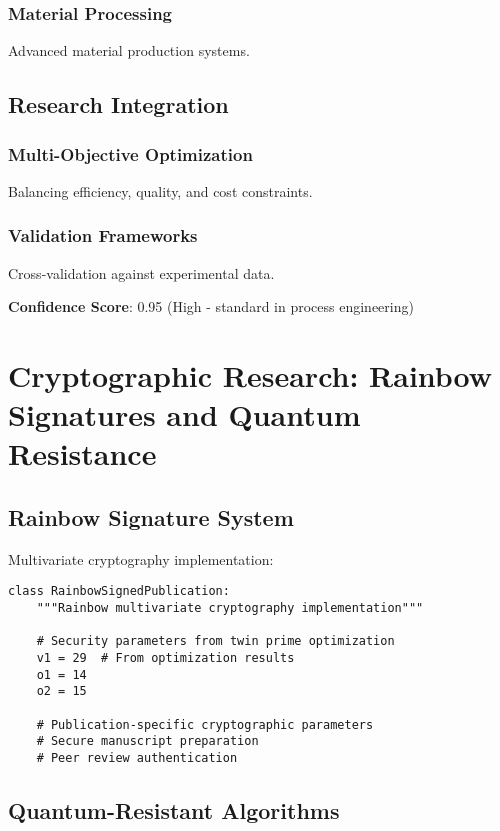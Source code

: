 \documentclass[11pt,a4paper]{article}
\begin{document}
\subsubsection{Material Processing}
Advanced material production systems.

\subsection{Research Integration}

\subsubsection{Multi-Objective Optimization}
Balancing efficiency, quality, and cost constraints.

\subsubsection{Validation Frameworks}
Cross-validation against experimental data.

\textbf{Confidence Score}: 0.95 (High - standard in process engineering)

\section{Cryptographic Research: Rainbow Signatures and Quantum Resistance}
\label{sec:cryptography}

\subsection{Rainbow Signature System}

Multivariate cryptography implementation:

\begin{lstlisting}[caption=Rainbow Cryptographic Parameters]
class RainbowSignedPublication:
    """Rainbow multivariate cryptography implementation"""

    # Security parameters from twin prime optimization
    v1 = 29  # From optimization results
    o1 = 14
    o2 = 15

    # Publication-specific cryptographic parameters
    # Secure manuscript preparation
    # Peer review authentication
\end{lstlisting}

\subsection{Quantum-Resistant Algorithms}
\end{document}
